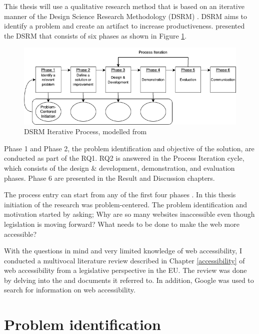 This thesis will use a qualitative research method that is based on an iterative manner of the Design Science Research Methodology (DSRM) \citep{designsciencemethodology, iterativedesignscience}. DSRM aims to identify a problem and create an artifact to increase productiveness. \textcite{iterativedesignscience} presented the DSRM that consists of six phases as shown in Figure \ref{fig:design-science}.

\begin{figure}
    \centering
    \includegraphics[width=1\linewidth]{DSRM.png}
    \caption{DSRM Iterative Process, modelled from \textcite{iterativedesignscience}}
    \label{fig:design-science}
\end{figure}

Phase 1 and Phase 2, the problem identification and objective of the solution, are conducted as part of the RQ1. RQ2 is answered in the Process Iteration cycle, which consists of the design \& development, demonstration, and evaluation phases. Phase 6 are presented in the Result and Discussion chapters.

The process entry can start from any of the first four phases \citep{iterativedesignscience}. In this thesis initiation of the research was problem-centered. The problem identification and motivation started by asking; Why are so many websites inaccessible even though legislation is moving forward? What needs to be done to make the web more accessible? 

With the questions in mind and very limited knowledge of web accessibility, I conducted a multivocal literature review described in Chapter \ref{accessibility} of web accessibility from a legislative perspective in the EU. The review was done by delving into the \textcite{eudirective2016} and documents it referred to. In addition, Google was used to search for information on web accessibility.

\section{Problem identification}

